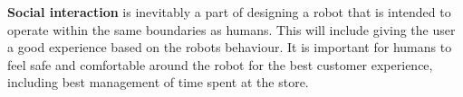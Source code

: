 \textbf{Social interaction} is inevitably a part of designing a robot that is intended to operate within the same boundaries as humans. This will include giving the user a good experience based on the robots behaviour. It is important for humans to feel safe and comfortable around the robot for the best customer experience, including best management of time spent at the store.\\